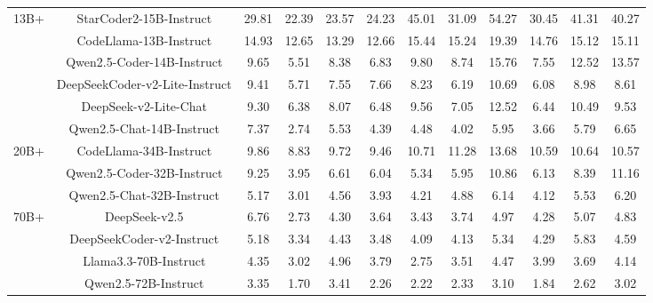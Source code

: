 \documentclass[11pt, a4paper, logo, copyright, nonumbering, amsart]{map}
\begin{document}
\begin{CJK*}{UTF8}{gbsn}
\begin{table*}[h!]
\begin{adjustbox}{width=\textwidth}
\begin{tabular}{c|c|cccccccccc}
    \midrule
    \multirow{6}{*}{13B+} 
    & StarCoder2-15B-Instruct & 29.81 & 22.39 & 23.57 & 24.23 & 45.01 & 31.09 & 54.27 & 30.45 & 41.31 & 40.27 \\
    & CodeLlama-13B-Instruct & 14.93 & 12.65 & 13.29 & 12.66 & 15.44 & 15.24 & 19.39 & 14.76 & 15.12 & 15.11 \\
    & Qwen2.5-Coder-14B-Instruct & 9.65 & 5.51 & 8.38 & 6.83 & 9.80 & 8.74 & 15.76 & 7.55 & 12.52 & 13.57 \\
    & DeepSeekCoder-v2-Lite-Instruct & 9.41 & 5.71 & 7.55 & 7.66 & 8.23 & 6.19 & 10.69 & 6.08 & 8.98 & 8.61 \\
    & DeepSeek-v2-Lite-Chat & 9.30 & 6.38 & 8.07 & 6.48 & 9.56 & 7.05 & 12.52 & 6.44 & 10.49 & 9.53 \\
    & Qwen2.5-Chat-14B-Instruct & 7.37 & 2.74 & 5.53 & 4.39 & 4.48 & 4.02 & 5.95 & 3.66 & 5.79 & 6.65 \\
    
    \midrule
    \multirow{3}{*}{20B+} 
    & CodeLlama-34B-Instruct & 9.86 & 8.83 & 9.72 & 9.46 & 10.71 & 11.28 & 13.68 & 10.59 & 10.64 & 10.57 \\
    & Qwen2.5-Coder-32B-Instruct & 9.25 & 3.95 & 6.61 & 6.04 & 5.34 & 5.95 & 10.86 & 6.13 & 8.39 & 11.16 \\
    & Qwen2.5-Chat-32B-Instruct & 5.17 & 3.01 & 4.56 & 3.93 & 4.21 & 4.88 & 6.14 & 4.12 & 5.53 & 6.20 \\
    
    \midrule
    \multirow{4}{*}{70B+} 
    & DeepSeek-v2.5 & 6.76 & 2.73 & 4.30 & 3.64 & 3.43 & 3.74 & 4.97 & 4.28 & 5.07 & 4.83 \\
    & DeepSeekCoder-v2-Instruct & 5.18 & 3.34 & 4.43 & 3.48 & 4.09 & 4.13 & 5.34 & 4.29 & 5.83 & 4.59 \\
    & Llama3.3-70B-Instruct & 4.35 & 3.02 & 4.96 & 3.79 & 2.75 & 3.51 & 4.47 & 3.99 & 3.69 & 4.14 \\
    & Qwen2.5-72B-Instruct & 3.35 & 1.70 & 3.41 & 2.26 & 2.22 & 2.33 & 3.10 & 1.84 & 2.62 & 3.02 \\
    

\end{tabular}
\end{adjustbox}
\end{table*}
\end{CJK*}
\end{document}
